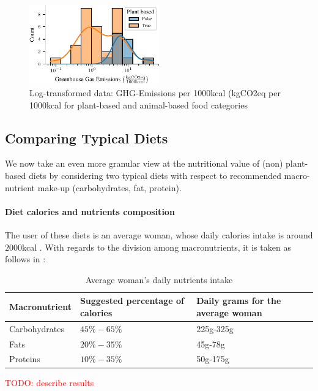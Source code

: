 \documentclass{article}
\begin{document}
\begin{figure}[h]
    \centering
    \includegraphics[width=0.5\textwidth]{figures/ghg-log.pdf}
    \caption{Log-transformed data: GHG-Emissions per 1000kcal (kgCO2eq per 1000kcal for plant-based and animal-based food categories}
    \label{fig:ghg-log}
\end{figure}



\subsection{Comparing Typical Diets}
We now take an even more granular view at the nutritional value of (non) plant-based diets by considering two typical diets with respect to recommended macro-nutrient make-up (carbohydrates, fat, protein).

\paragraph*{Diet calories and nutrients composition} 
The user of these diets is an average woman, whose daily calories intake is around $2000$kcal \cite{NHS}. With regards to the division among macronutrients, it is taken as follows in  \cite{Healthline}:

\begin{table} 
  \caption{Average woman's daily nutrients intake}
  \label{tbl:composition}
  \centering
  \begin{tabular}{lll}
    \toprule
    Macronutrient     & Suggested percentage of calories   & Daily grams for the average woman  \\
    \midrule
    Carbohydrates & $45\%-65\%$ &  225g-325g  \\
    Fats    & $20\%-35\% $  & 45g-78g \\
    Proteins & $10\%-35\%$ & 50g-175g \\
    \bottomrule
  \end{tabular}
\end{table}

\textcolor{red}{TODO: describe results}
\end{document}
